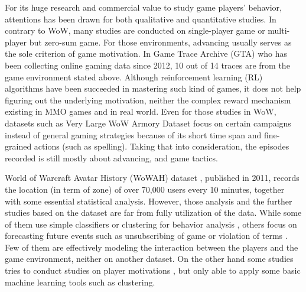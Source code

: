 \documentclass{sigchi}
\begin{document}
For its huge research and commercial value to study game players' behavior, attentions has been drawn for both qualitative and quantitative studies.
In contrary to WoW, many studies are conducted on single-player game or multi-player but zero-sum game.
For those environments, advancing usually serves as the sole criterion of game motivation.
In Game Trace Archive (GTA) \cite{guo2012game} who has been collecting online gaming data since 2012, 10 out of 14 traces are from the game environment stated above.
Although reinforcement learning (RL) algorithms have been succeeded in mastering such kind of games, it does not help figuring out the underlying motivation, neither the complex reward mechanism existing in MMO games and in real world.
Even for those studies in WoW, datasets such as Very Large WoW Armory Dataset \cite{Bell2013a} focus on certain campaigns instead of general gaming strategies because of its short time span and fine-grained actions (such as spelling).
Taking that into consideration, the episodes recorded is still mostly about advancing, and game tactics.

World of Warcraft Avatar History (WoWAH) dataset \cite{lee2011world}, published in 2011, records the location (in term of zone) of over 70,000 users every 10 minutes, together with some essential statistical analysis.
However, those analysis and the further studies based on the dataset are far from fully utilization of the data.
While some of them use simple classifiers or clustering for behavior analysis \cite{suznjevic2011mmorpg,drachen2014comparison}, others focus on forecasting future events such as unsubscribing of game or violation of terms \cite{bauckhage2015clustering,thawonmas2011analysis,lou2012forecasting}.
Few of them are effectively modeling the interaction between the players and the game environment, neither on another dataset. 
On the other hand some studies tries to conduct studies on player motivations \cite{Bell2013a}, but only able to apply some basic machine learning tools such as clustering.
\end{document}
